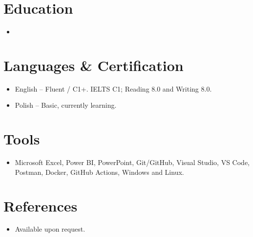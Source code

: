 \documentclass[11pt,a4paper,sans]{moderncv}
\begin{document}
\section{Education}
\vspace{1pt}
\begin{itemize}
\item{}
\end{itemize}

\section{Languages \& Certification}
\vspace{1pt}
\begin{itemize}
\item English -- Fluent / C1+. IELTS C1; Reading 8.0 and Writing 8.0.
\item Polish -- Basic, currently learning.
\end{itemize}

\section{Tools}
\vspace{1pt}
\begin{itemize}
\item Microsoft Excel, Power BI, PowerPoint, Git/GitHub, Visual Studio, VS Code, Postman, Docker, GitHub Actions, Windows and Linux.
\end{itemize}

\section{References}
\vspace{1pt}
\begin{itemize}
\item Available upon request.
\end{itemize}
\end{document}
